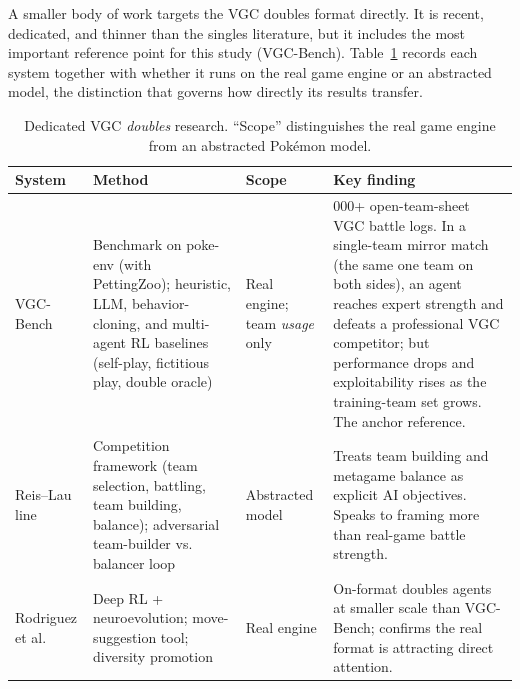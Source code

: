 A smaller body of work targets the VGC doubles format directly. It is recent,
dedicated, and thinner than the singles literature, but it includes the most
important reference point for this study (VGC-Bench). Table~\ref{tab:vgc} records
each system together with whether it runs on the real game engine or an abstracted
model, the distinction that governs how directly its results transfer.

\begin{table}[ht]
\small
\tablespacing
\begin{tabularx}{\textwidth}{@{}>{\hsize=0.62\hsize\raggedright\arraybackslash}X
                                >{\hsize=1.18\hsize\raggedright\arraybackslash}X
                                >{\hsize=0.70\hsize\raggedright\arraybackslash}X
                                >{\hsize=1.50\hsize\raggedright\arraybackslash}X@{}}
\toprule
\textbf{System} & \textbf{Method} & \textbf{Scope} & \textbf{Key finding} \\
\midrule
VGC-Bench \cite{angliss2026vgcbench}
  & Benchmark on poke-env (with PettingZoo); heuristic, LLM, behavior-cloning, and
    multi-agent RL baselines (self-play, fictitious play, double oracle)
  & Real engine; team \emph{usage} only
  & 700{,}000+ open-team-sheet VGC battle logs. In a single-team mirror match
    (the same one team on both sides), an agent reaches expert strength and
    defeats a professional VGC competitor; but performance drops and
    exploitability rises as the training-team set grows. The anchor reference. \\
\addlinespace
Reis--Lau line \cite{reis2021vgccompetition,reis2023adversarial}
  & Competition framework (team selection, battling, team building, balance);
    adversarial team-builder vs. balancer loop
  & Abstracted model
  & Treats team building and metagame balance as explicit AI objectives. Speaks
    to framing more than real-game battle strength. \\
\addlinespace
Rodriguez et al. \cite{rodriguez2024neuroevolution}
  & Deep RL + neuroevolution; move-suggestion tool; diversity promotion
  & Real engine
  & On-format doubles agents at smaller scale than VGC-Bench; confirms the real
    format is attracting direct attention. \\
\bottomrule
\end{tabularx}
\caption{Dedicated VGC \emph{doubles} research. ``Scope'' distinguishes the real
game engine from an abstracted Pok\'{e}mon model.}
\label{tab:vgc}
\end{table}

